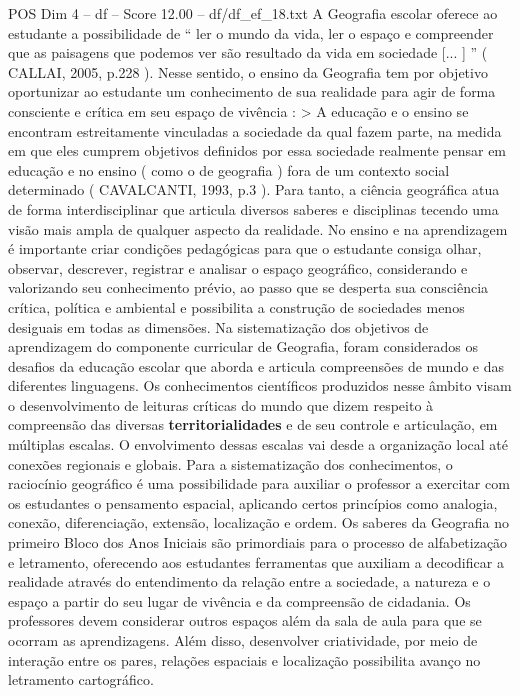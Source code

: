 \begin{textsample}{POS Dim 4 – df – Score 12.00 – df/df\_ef\_18.txt}
A Geografia escolar oferece ao estudante a possibilidade de “ ler o mundo da vida, ler o espaço e compreender que as paisagens que podemos ver são resultado da vida em sociedade [... ] ” ( CALLAI, 2005, p.228 ).
Nesse sentido, o ensino da Geografia tem por objetivo oportunizar ao estudante um conhecimento de sua realidade para agir de forma consciente e crítica em seu espaço de vivência : > A educação e o ensino se encontram estreitamente vinculadas a sociedade da qual fazem parte, na medida em que eles cumprem objetivos definidos por essa sociedade realmente pensar em educação e no ensino ( como o de geografia ) fora de um contexto social determinado ( CAVALCANTI, 1993, p.3 ).
Para tanto, a ciência geográfica atua de forma interdisciplinar que articula diversos saberes e disciplinas tecendo uma visão mais ampla de qualquer aspecto da realidade.
No ensino e na aprendizagem é importante criar condições pedagógicas para que o estudante consiga olhar, observar, descrever, registrar e analisar o espaço geográfico, considerando e valorizando seu conhecimento prévio, ao passo que se desperta sua consciência crítica, política e ambiental e possibilita a construção de sociedades menos desiguais em todas as dimensões.
Na sistematização dos objetivos de aprendizagem do componente curricular de Geografia, foram considerados os desafios da educação escolar que aborda e articula compreensões de mundo e das diferentes linguagens.
Os conhecimentos científicos produzidos nesse âmbito visam o desenvolvimento de leituras críticas do mundo que dizem respeito à compreensão das diversas \textbf{territorialidades} e de seu controle e articulação, em múltiplas escalas.
O envolvimento dessas escalas vai desde a organização local até conexões regionais e globais.
Para a sistematização dos conhecimentos, o raciocínio geográfico é uma possibilidade para auxiliar o professor a exercitar com os estudantes o pensamento espacial, aplicando certos princípios como analogia, conexão, diferenciação, extensão, localização e ordem.
Os saberes da Geografia no primeiro Bloco dos Anos Iniciais são primordiais para o processo de alfabetização e letramento, oferecendo aos estudantes ferramentas que auxiliam a decodificar a realidade através do entendimento da relação entre a sociedade, a natureza e o espaço a partir do seu lugar de vivência e da compreensão de cidadania.
Os professores devem considerar outros espaços além da sala de aula para que se ocorram as aprendizagens.
Além disso, desenvolver criatividade, por meio de interação entre os pares, relações espaciais e localização possibilita avanço no letramento cartográfico.

\end{textsample}
